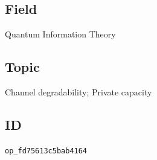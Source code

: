 \subsection*{Field}

Quantum Information Theory

\subsection*{Topic}

Channel degradability; Private capacity

\subsection*{ID}

\texttt{op\_fd75613c5bab4164}
